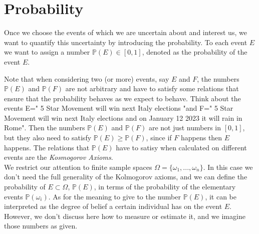 \documentclass[12pt]{article}
\newcommand{\<}{{\langle \!\! \langle}}
\renewcommand{\>}{{\rangle \!\! \rangle}}
\begin{document}
%
%
%
%
%
%
%
%
%

\section{Probability}

Once we choose the events of which we are uncertain about and interest us, we want to quantify this uncertainty by introducing the probability. To each event $E$ we want to assign a number $\mathbb{P}(E)\in[0,1]$, denoted as the probability of the event $E$. 
 
Note that when considering two (or more) events, say $E$ and $F$, the numbers $\mathbb{P}(E)$ and $\mathbb{P}(F)$ are not arbitrary and have to satisfy some relations that ensure that the probability behaves as we expect to behave. Think about the events E=" 5 Star Movement will win next Italy elections "and F=" 5 Star Movement will win next Italy elections and on January 12 2023 it will rain in Rome". Then the numbers $\mathbb{P}(E)$ and $\mathbb{P}(F)$ are not just numbers in  $[0,1]$, but they also need to satisfy $\mathbb{P}(E) \geq \mathbb{P}(F)$, since if $F$ happens then $E$ happens. The relations that $\mathbb{P}(E)$ have to satisy when calculated on different events are the \emph{Kosmogorov Axioms}.\\
 We restrict our attention to finite sample spaces $\Omega=\{\omega_1,...,\omega_n\}$. In this case we don't need the full generality of the Kolmogorov axioms,  and we can define the probability of $E \subset \Omega$, $\mathbb{P}(E)$, in  terms of the probability of the elementary events $\mathbb{P}(\omega_i)$.
 As for the meaning to give to the number $\mathbb{P}(E)$, it can be interpreted as the degree of belief a certain individual has on the event $E$. However, we don't discuss here how to measure or estimate it, and we imagine those numbers as given. 
\end{document}
